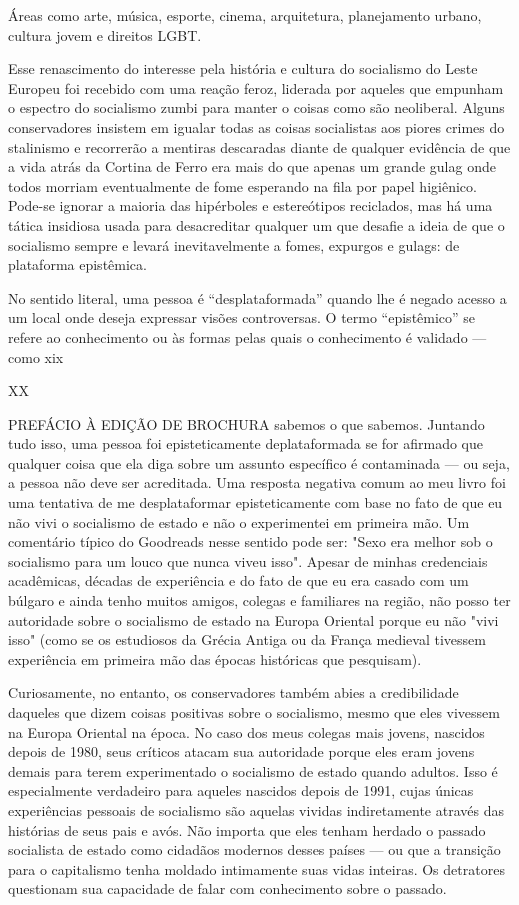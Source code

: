  \par 
Áreas como arte, música, esporte, cinema, arquitetura, planejamento urbano, cultura jovem e direitos LGBT.
 \par 
Esse renascimento do interesse pela história e cultura do socialismo do Leste Europeu foi recebido com uma reação feroz, liderada por aqueles que empunham o espectro do socialismo zumbi para manter o coisas como são neoliberal. Alguns conservadores insistem em igualar todas as coisas socialistas aos piores crimes do stalinismo e recorrerão a mentiras descaradas diante de qualquer evidência de que a vida atrás da Cortina de Ferro era mais do que apenas um grande gulag onde todos morriam eventualmente de fome esperando na fila por papel higiênico. Pode-se ignorar a maioria das hipérboles e estereótipos reciclados, mas há uma tática insidiosa usada para desacreditar qualquer um que desafie a ideia de que o socialismo sempre e levará inevitavelmente a fomes, expurgos e gulags: de plataforma epistêmica.
 \par 
No sentido literal, uma pessoa é “desplataformada” quando lhe é negado acesso a um local onde deseja expressar visões controversas. O termo “epistêmico” se refere ao conhecimento ou às formas pelas quais o conhecimento é validado — como xix
 \par 
XX
 \par 
PREFÁCIO À EDIÇÃO DE BROCHURA sabemos o que sabemos. Juntando tudo isso, uma pessoa foi episteticamente deplataformada se for afirmado que qualquer coisa que ela diga sobre um assunto específico é contaminada — ou seja, a pessoa não deve ser acreditada. Uma resposta negativa comum ao meu livro foi uma tentativa de me desplataformar episteticamente com base no fato de que eu não vivi o socialismo de estado e não o experimentei em primeira mão. Um comentário típico do Goodreads nesse sentido pode ser: "Sexo era melhor sob o socialismo para um louco que nunca viveu isso". Apesar de minhas credenciais acadêmicas, décadas de experiência e do fato de que eu era casado com um búlgaro e ainda tenho muitos amigos, colegas e familiares na região, não posso ter autoridade sobre o socialismo de estado na Europa Oriental porque eu não "vivi isso" (como se os estudiosos da Grécia Antiga ou da França medieval tivessem experiência em primeira mão das épocas históricas que pesquisam).
 \par 
Curiosamente, no entanto, os conservadores também abies a credibilidade daqueles que dizem coisas positivas sobre o socialismo, mesmo que eles vivessem na Europa Oriental na época. No caso dos meus colegas mais jovens, nascidos depois de 1980, seus críticos atacam sua autoridade porque eles eram jovens demais para terem experimentado o socialismo de estado quando adultos. Isso é especialmente verdadeiro para aqueles nascidos depois de 1991, cujas únicas experiências pessoais de socialismo são aquelas vividas indiretamente através das histórias de seus pais e avós. Não importa que eles tenham herdado o passado socialista de estado como cidadãos modernos desses países — ou que a transição para o capitalismo tenha moldado intimamente suas vidas inteiras. Os detratores questionam sua capacidade de falar com conhecimento sobre o passado.
